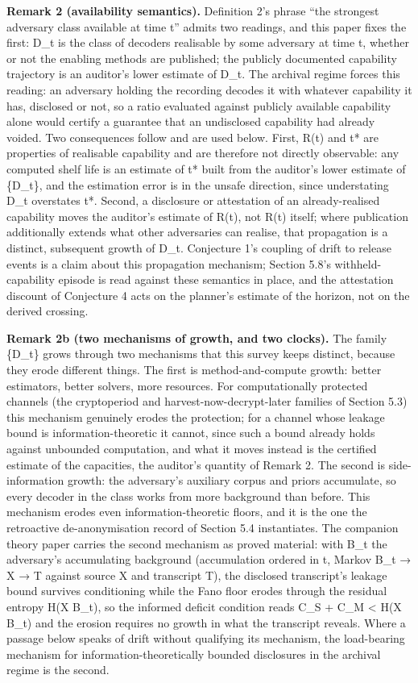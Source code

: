 \documentclass[
]{llncs}
\begin{document}
\textbf{Remark 2 (availability semantics).} Definition 2's phrase ``the
strongest adversary class available at time t'' admits two readings, and
this paper fixes the first: D\_t is the class of decoders realisable by
some adversary at time t, whether or not the enabling methods are
published; the publicly documented capability trajectory is an auditor's
lower estimate of D\_t. The archival regime forces this reading: an
adversary holding the recording decodes it with whatever capability it
has, disclosed or not, so a ratio evaluated against publicly available
capability alone would certify a guarantee that an undisclosed
capability had already voided. Two consequences follow and are used
below. First, R(t) and t* are properties of realisable capability and
are therefore not directly observable: any computed shelf life is an
estimate of t* built from the auditor's lower estimate of \{D\_t\}, and
the estimation error is in the unsafe direction, since understating D\_t
overstates t*. Second, a disclosure or attestation of an
already-realised capability moves the auditor's estimate of R(t), not
R(t) itself; where publication additionally extends what other
adversaries can realise, that propagation is a distinct, subsequent
growth of D\_t. Conjecture 1's coupling of drift to release events is a
claim about this propagation mechanism; Section 5.8's
withheld-capability episode is read against these semantics in place,
and the attestation discount of Conjecture 4 acts on the planner's
estimate of the horizon, not on the derived crossing.

\textbf{Remark 2b (two mechanisms of growth, and two clocks).} The
family \{D\_t\} grows through two mechanisms that this survey keeps
distinct, because they erode different things. The first is
method-and-compute growth: better estimators, better solvers, more
resources. For computationally protected channels (the cryptoperiod and
harvest-now-decrypt-later families of Section 5.3) this mechanism
genuinely erodes the protection; for a channel whose leakage bound is
information-theoretic it cannot, since such a bound already holds
against unbounded computation, and what it moves instead is the
certified estimate of the capacities, the auditor's quantity of Remark
2. The second is side-information growth: the adversary's auxiliary
corpus and priors accumulate, so every decoder in the class works from
more background than before. This mechanism erodes even
information-theoretic floors, and it is the one the retroactive
de-anonymisation record of Section 5.4 instantiates. The companion
theory paper carries the second mechanism as proved material: with B\_t
the adversary's accumulating background (accumulation ordered in t,
Markov B\_t → X → T against source X and transcript T), the disclosed
transcript's leakage bound survives conditioning while the Fano floor
erodes through the residual entropy H(X \textbar{} B\_t), so the
informed deficit condition reads C\_S + C\_M \textless{} H(X \textbar{}
B\_t) and the erosion requires no growth in what the transcript reveals.
Where a passage below speaks of drift without qualifying its mechanism,
the load-bearing mechanism for information-theoretically bounded
disclosures in the archival regime is the second.
\end{document}

